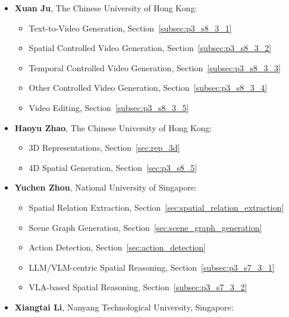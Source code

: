 \begin{itemize}[leftmargin=*]
        \begin{itemize}
            \item Keypoint and Landmark Detection, Section~\ref{sec:keypoint_landmark}
            \item Depth Estimation, Section~\ref{sec:depth_estimation}
            \item Natural Science, Section~\ref{sec:Natural Science}
        \end{itemize}
    \item \textbf{Xuan Ju}, The Chinese University of Hong Kong:
        \begin{itemize}
            \item Text-to-Video Generation, Section~\ref{subsec:p3_s8_3_1}
            \item Spatial Controlled Video Generation, Section~\ref{subsec:p3_s8_3_2}
            \item Temporal Controlled Video Generation, Section~\ref{subsec:p3_s8_3_3}
            \item Other Controlled Video Generation, Section~\ref{subsec:p3_s8_3_4}
            \item Video Editing, Section~\ref{subsec:p3_s8_3_5}
        \end{itemize}
    \item \textbf{Haoyu Zhao}, The Chinese University of Hong Kong:
        \begin{itemize}
            \item 3D Representations, Section~\ref{sec:rep_3d}
            \item 4D Spatial Generation, Section~\ref{sec:p3_s8_5}
        \end{itemize}
    \item \textbf{Yuchen Zhou}, National University of Singapore:
        \begin{itemize}
            \item Spatial Relation Extraction, Section~\ref{sec:spatial_relation_extraction}
            \item Scene Graph Generation, Section~\ref{sec:scene_graph_generation}
            \item Action Detection, Section~\ref{sec:action_detection}
            \item LLM/VLM-centric Spatial Reasoning, Section~\ref{subsec:p3_s7_3_1}
            \item VLA-based Spatial Reasoning, Section~\ref{subsec:p3_s7_3_2}
        \end{itemize}
    \item \textbf{Xiangtai Li}, Nanyang Technological University, Singapore:

\end{itemize}
